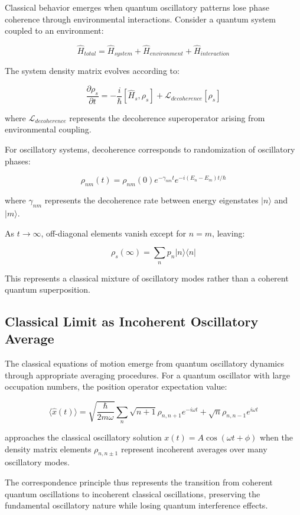 \documentclass[11pt]{article}
\theoremstyle{remark}
\begin{document}
Classical behavior emerges when quantum oscillatory patterns lose phase coherence through environmental interactions. Consider a quantum system coupled to an environment:

$$\hat{H}_{total} = \hat{H}_{system} + \hat{H}_{environment} + \hat{H}_{interaction}$$

The system density matrix evolves according to:

$$\frac{\partial \rho_s}{\partial t} = -\frac{i}{\hbar}[\hat{H}_s, \rho_s] + \mathcal{L}_{decoherence}[\rho_s]$$

where $\mathcal{L}_{decoherence}$ represents the decoherence superoperator arising from environmental coupling.

For oscillatory systems, decoherence corresponds to randomization of oscillatory phases:

$$\rho_{nm}(t) = \rho_{nm}(0) e^{-\gamma_{nm} t} e^{-i(E_n - E_m)t/\hbar}$$

where $\gamma_{nm}$ represents the decoherence rate between energy eigenstates $|n\rangle$ and $|m\rangle$.

As $t \to \infty$, off-diagonal elements vanish except for $n = m$, leaving:

$$\rho_s(\infty) = \sum_n p_n |n\rangle\langle n|$$

This represents a classical mixture of oscillatory modes rather than a coherent quantum superposition.

\subsection{Classical Limit as Incoherent Oscillatory Average}

The classical equations of motion emerge from quantum oscillatory dynamics through appropriate averaging procedures. For a quantum oscillator with large occupation numbers, the position operator expectation value:

$$\langle \hat{x}(t)\rangle = \sqrt{\frac{\hbar}{2m\omega}} \sum_n \sqrt{n+1} \rho_{n,n+1} e^{-i\omega t} + \sqrt{n} \rho_{n,n-1} e^{i\omega t}$$

approaches the classical oscillatory solution $x(t) = A\cos(\omega t + \phi)$ when the density matrix elements $\rho_{n,n±1}$ represent incoherent averages over many oscillatory modes.

The correspondence principle thus represents the transition from coherent quantum oscillations to incoherent classical oscillations, preserving the fundamental oscillatory nature while losing quantum interference effects.
\end{document}
